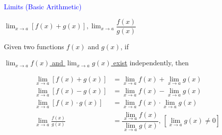\documentclass[14pt,fleqn]{extarticle}
\begin{document}
\begin{skill}
\textcolor{blue}{Limits (Basic Arithmetic)} 

\small$\lim_{x\to a}\left[ f(x) + g(x) \right], \lim_{x\to a}\dfrac{f(x)}{g(x)}$
\end{skill}

\newcard 

Given two functions $f(x)$ and $g(x)$, if

\underline{$\lim_{x\to a}f(x)$ and $\lim_{x\to a}g(x)$ exist}
independently, then 

%
\begin{align}
\lim_{x\to a}\left[ f(x) + g(x)\right] &= \lim_{x\to a}f(x) + \lim_{x\to a}g(x)  \\
\lim_{x\to a}\left[ f(x) - g(x)\right] &= \lim_{x\to a}f(x) - \lim_{x\to a}g(x) \\
\lim_{x\to a}\left[ f(x)\cdot g(x)\right] &= \lim_{x\to a}f(x)\cdot\lim_{x\to a}g(x)  \\
\lim_{x\to a}\frac{f(x)}{g(x)} &= \dfrac{\lim_{x\to a}f(x)}{\lim_{x\to a}g(x)},\, \left[ \lim_{x\to a}g(x) \neq 0\right]
\end{align}  
\end{document}
